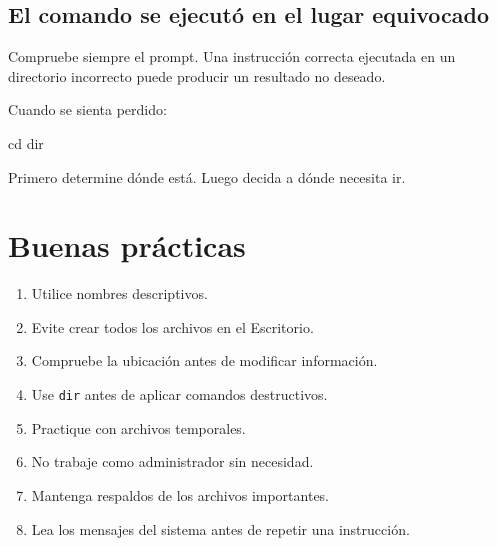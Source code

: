 \documentclass[
  spanish,
  letterpaper,
]{scrbook}
\newenvironment{Shaded}{\begin{snugshade}}{\end{snugshade}}
\newcommand{\BuiltInTok}[1]{\textcolor[rgb]{0.00,0.23,0.31}{#1}}
\providecommand{\tightlist}{%
  \setlength{\itemsep}{0pt}\setlength{\parskip}{0pt}}
\begin{document}
\section{El comando se ejecutó en el lugar
equivocado}\label{el-comando-se-ejecutuxf3-en-el-lugar-equivocado}

Compruebe siempre el prompt. Una instrucción correcta ejecutada en un
directorio incorrecto puede producir un resultado no deseado.

\begin{tcolorbox}[enhanced jigsaw, arc=.35mm, bottomrule=.15mm, bottomtitle=1mm, breakable, colback=white, colbacktitle=quarto-callout-tip-color!10!white, colframe=quarto-callout-tip-color-frame, coltitle=black, left=2mm, leftrule=.75mm, opacityback=0, opacitybacktitle=0.6, rightrule=.15mm, title=\textcolor{quarto-callout-tip-color}{\faLightbulb}\hspace{0.5em}{Método de recuperación}, titlerule=0mm, toprule=.15mm, toptitle=1mm]

Cuando se sienta perdido:

\begin{Shaded}
\begin{Highlighting}[]
\BuiltInTok{cd}
\BuiltInTok{dir}
\end{Highlighting}
\end{Shaded}

Primero determine dónde está. Luego decida a dónde necesita ir.

\end{tcolorbox}


\chapter{Buenas prácticas}\label{buenas-pruxe1cticas}

\begin{enumerate}
\def\labelenumi{\arabic{enumi}.}
\tightlist
\item
  Utilice nombres descriptivos.
\item
  Evite crear todos los archivos en el Escritorio.
\item
  Compruebe la ubicación antes de modificar información.
\item
  Use \texttt{dir} antes de aplicar comandos destructivos.
\item
  Practique con archivos temporales.
\item
  No trabaje como administrador sin necesidad.
\item
  Mantenga respaldos de los archivos importantes.
\item
  Lea los mensajes del sistema antes de repetir una instrucción.
\end{enumerate}
\end{document}
